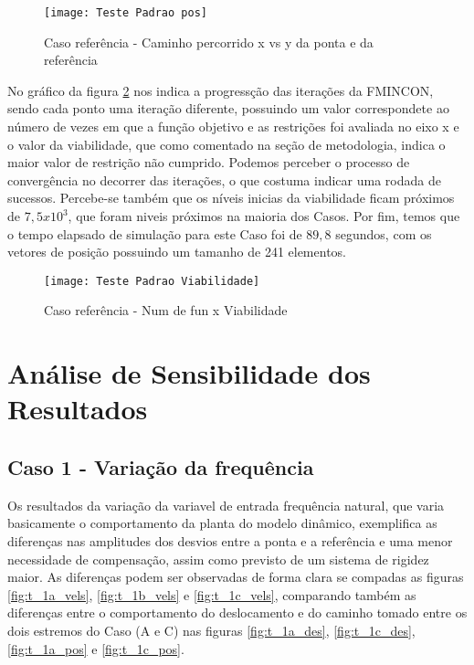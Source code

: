 \begin{figure}[H]
    \begin{center}
    \caption{Caso referência - Caminho percorrido x vs y da ponta e da referência}
    \texttt{[image: Teste Padrao pos]}
    \label{fig:t_padr_pos}
    \end{center}
\end{figure}

No gráfico da figura \ref{fig:t_padr_viab} nos indica a progressção das iterações da FMINCON, sendo cada
ponto uma iteração diferente, possuindo um valor correspondete ao número de vezes em que a função objetivo e as restrições foi avaliada
no eixo x e o valor da viabilidade, que como comentado na seção de metodologia, indica o maior valor de restrição não cumprido.
Podemos perceber o processo de convergência no decorrer das iterações, o que costuma indicar uma rodada de sucessos.
Percebe-se também que os níveis inicias da viabilidade ficam próximos de $7,5x10^3$, que foram niveis próximos na maioria dos Casos.
Por fim, temos que o tempo elapsado de simulação para este Caso foi de $89,8$ segundos, com os vetores de posição possuindo
um tamanho de 241 elementos.

\begin{figure}[H]
    \begin{center}
    \caption{Caso referência - Num de fun x Viabilidade}
    \texttt{[image: Teste Padrao Viabilidade]}
    \label{fig:t_padr_viab}
    \end{center}
\end{figure}

\section{Análise de Sensibilidade dos Resultados}
\subsection{Caso 1 - Variação da frequência}
Os resultados da variação da variavel de entrada frequência natural, que varia basicamente o comportamento da planta do
modelo dinâmico, exemplifica as diferenças nas amplitudes dos desvios entre a ponta e a referência e uma menor necessidade de compensação, assim como previsto
de um sistema de rigidez maior.
As diferenças podem ser observadas de forma clara se compadas as figuras \ref{fig:t_1a_vels}, \ref{fig:t_1b_vels} e \ref{fig:t_1c_vels},
comparando também as diferenças entre o comportamento do deslocamento e do caminho tomado entre os dois estremos do Caso (A e C) nas figuras
\ref{fig:t_1a_des}, \ref{fig:t_1c_des}, \ref{fig:t_1a_pos} e \ref{fig:t_1c_pos}.

